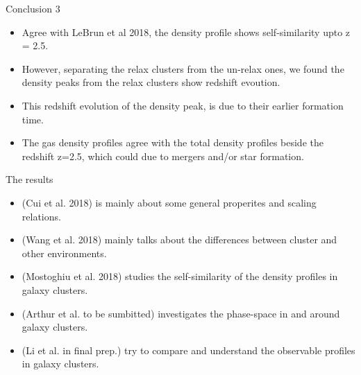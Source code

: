 \documentclass[aspectratio=43]{beamer}
\begin{document}
\begin{frame}{Conclusion 3}
 
  \begin{itemize}
    \item Agree with LeBrun et al 2018, the density profile shows self-similarity upto z = 2.5.
    \item However, separating the relax clusters from the un-relax ones, we found the density peaks from the relax clusters show redshift evoution.
    \item This redshift evolution of the density peak, is due to their earlier formation time.
    \item The gas density profiles agree with the total density profiles beside the redshift z=2.5, which could due to mergers and/or star formation.
  \end{itemize}
    \begin{center}
    \hyperlink{lastpage}{}    
  \end{center}
\end{frame}

\begin{frame}
  \begin{center}
    {\Huge The results} \\
    \bigskip
  \end{center}

  \begin{itemize}
      \item \hyperlink{intropaper}{} (Cui et al. 2018) is mainly about some general properites and scaling relations.
      \item \hyperlink{Wang}{} (Wang et al. 2018)  mainly talks about the differences between cluster and other environments.
      \item \hyperlink{Mostoghiu}{} (Mostoghiu et al. 2018) studies the self-similarity of the density profiles in galaxy clusters.
      \item \hyperlink{Arthur}{} (Arthur et al. to be sumbitted) investigates the phase-space in and around galaxy clusters.
      \item \hyperlink{Li}{} (Li et al. in final prep.) try to compare and understand the observable profiles in galaxy clusters.
  \end{itemize}
\end{frame}
\end{document}
